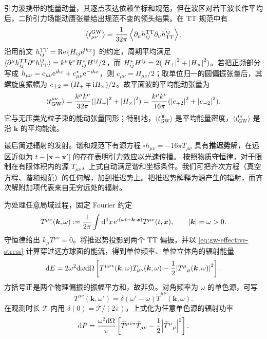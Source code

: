 引力波携带的能量动量，其逐点表达依赖坐标和规范，但在波区对若干波长作平均后，二阶引力场能动赝张量给出规范不变的领头结果。在 TT 规范中有
\begin{equation}\label{eq:gw-effective-stress}
    \left\langle t_{\mu\nu}^{\mathrm{GW}}\right\rangle
    =\frac{1}{32\pi}
      \left\langle\partial_\mu h_{ij}^{\mathrm{TT}}\partial_\nu h_{\mathrm{TT}}^{ij}\right\rangle .
\end{equation}
沿用前文 $h_{ij}^{\mathrm{TT}}=\Re\{H_{ij}\mathrm{e}^{\mathrm{i} kx}\}$ 的约定，周期平均满足 $\langle\partial^\mu h_{ij}^{\mathrm{TT}}\partial^\nu h_{\mathrm{TT}}^{ij}\rangle=k^\mu k^\nu H_{ij}^*H^{ij}/2$，而 $H_{ij}^*H^{ij}=2(\abs{H_+}^2+\abs{H_\times}^2)$。若把正频部分写成 $h_{\mu\nu}=e_{\mu\nu}\mathrm{e}^{\mathrm{i} kx}+e_{\mu\nu}^*\mathrm{e}^{-\mathrm{i} kx}$，则 $e_{\mu\nu}=H_{\mu\nu}/2$；取单位归一的圆偏振张量后，其螺旋度振幅为 $e_{\pm2}=(H_+\mp\mathrm{i} H_\times)/2$。故平面波的平均能动张量为
\begin{equation}\label{eq:gw-plane-wave-stress}
    \left\langle t^{\mu\nu}_{\mathrm{GW}}\right\rangle
    =\frac{k^\mu k^\nu}{32\pi}
       (\abs{H_+}^2+\abs{H_\times}^2)
    =\frac{k^\mu k^\nu}{16\pi}
       (\abs{e_{+2}}^2+\abs{e_{-2}}^2).
\end{equation}
它与无压类光粒子束的能动张量同形；特别地，$\langle t^{00}_{\mathrm{GW}}\rangle$ 是平均能量密度，$\langle t^{0i}_{\mathrm{GW}}\rangle$ 是沿 $\bm k$ 的平均能流。

最后简述辐射的发射。谐和规范下有源方程 $\square\bar h_{\mu\nu}=-16\pi T_{\mu\nu}$ 具有\textbf{推迟势}解，在远区近似为
$t-|\bm x-\bm x'|$ 的存在表明引力效应以光速传播。
按照物质守恒律，对于限制在有限体积内的源 $T_{\mu\nu}$，上式自动满足谐和坐标条件。我们可把齐次方程（真空方程、谐和规范）的任何解，加到推迟势上。把推迟势解释为源产生的辐射，而齐次解附加项代表来自无穷远处的辐射。

为处理任意局域过程，固定 Fourier 约定
\[
    T^{\mu\nu}(\bm k,\omega):=\frac{1}{2\pi}
    \int\dd[4]{x}\mathrm{e}^{\mathrm{i}(\omega t-\bm k\cdot\bm x)}T^{\mu\nu}(t,\bm x),
    \qquad \abs{\bm k}=\omega>0.
\]
守恒律给出 $k_\mu T^{\mu\nu}=0$。将推迟势投影到两个 TT 偏振，并以 \eqref{eq:gw-effective-stress} 计算穿过远方球面的能流，得到单位频率、单位立体角的辐射能量
\begin{equation}\label{eq:arbitrary-source-radiated-energy}
    \dd E=2\omega^2\dd\omega\dd\Omega
    \left[T^{\mu\nu *}(\bm k,\omega)T_{\mu\nu}(\bm k,\omega)
    -\frac12\abs{T^\mu{}_\mu(\bm k,\omega)}^2\right].
\end{equation}
方括号正是两个物理偏振的振幅平方和，故非负。对角频率为 $\omega$ 的单色源，可写
\[
    T^{\mu\nu}(\bm k,\omega')
    =\delta(\omega'-\omega)\widetilde T^{\mu\nu}(\bm k,\omega).
\]
在观测时长 $\mathcal T$ 内用 $\delta(0)=\mathcal T/(2\pi)$，上式化为任意单色源的辐射功率
\begin{equation}\label{eq:arbitrary-source-radiated-power}
    \dd P=\frac{\omega^2\dd\Omega}{\pi}
    \left[\widetilde T^{\mu\nu *}\widetilde T_{\mu\nu}
    -\frac12\abs{\widetilde T^\mu{}_\mu}^2\right].
\end{equation}


